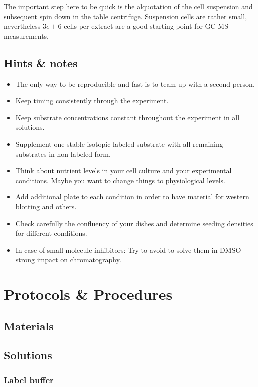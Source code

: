 \documentclass[]{book}
\providecommand{\tightlist}{%
  \setlength{\itemsep}{0pt}\setlength{\parskip}{0pt}}
\theoremstyle{definition}
\theoremstyle{definition}
\theoremstyle{definition}
\theoremstyle{remark}
\begin{document}
The important step here to be quick is the alquotation of the cell
suspension and subsequent spin down in the table centrifuge. Suspension
cells are rather small, nevertheless \(3e+6\) cells per extract are a
good starting point for GC-MS measurements.

\section{Hints \& notes}\label{hints-notes}

\begin{itemize}
\tightlist
\item
  The only way to be reproducible and fast is to team up with a second
  person.
\item
  Keep timing consistently through the experiment.
\item
  Keep substrate concentrations constant throughout the experiment in
  all solutions.
\item
  Supplement one stable isotopic labeled substrate with all remaining
  substrates in non-labeled form.
\item
  Think about nutrient levels in your cell culture and your experimental
  conditions. Maybe you want to change things to physiological levels.
\item
  Add additional plate to each condition in order to have material for
  western blotting and others.
\item
  Check carefully the confluency of your dishes and determine seeding
  densities for different conditions.
\item
  In case of small molecule inhibitors: Try to avoid to solve them in
  DMSO - strong impact on chromatography.
\end{itemize}

\chapter{Protocols \& Procedures}\label{protocols}

\section{Materials}\label{materials}

\section{Solutions}\label{solutions}

\hypertarget{washingbuffer}{\subsection{Label
buffer}\label{washingbuffer}}
\end{document}

